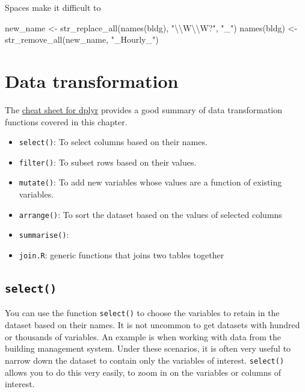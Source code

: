\documentclass[
]{book}
\newenvironment{Shaded}{\begin{snugshade}}{\end{snugshade}}
\newcommand{\FunctionTok}[1]{\textcolor[rgb]{0.00,0.00,0.00}{#1}}
\newcommand{\NormalTok}[1]{#1}
\newcommand{\OtherTok}[1]{\textcolor[rgb]{0.56,0.35,0.01}{#1}}
\newcommand{\SpecialCharTok}[1]{\textcolor[rgb]{0.00,0.00,0.00}{#1}}
\newcommand{\StringTok}[1]{\textcolor[rgb]{0.31,0.60,0.02}{#1}}
\providecommand{\tightlist}{%
  \setlength{\itemsep}{0pt}\setlength{\parskip}{0pt}}
\begin{document}
Spaces make it difficult to

\begin{Shaded}
\begin{Highlighting}[]
\NormalTok{new\_name }\OtherTok{\textless{}{-}} \FunctionTok{str\_replace\_all}\NormalTok{(}\FunctionTok{names}\NormalTok{(bldg), }\StringTok{"}\SpecialCharTok{\textbackslash{}\textbackslash{}}\StringTok{W}\SpecialCharTok{\textbackslash{}\textbackslash{}}\StringTok{W?"}\NormalTok{, }\StringTok{"\_"}\NormalTok{)}
\FunctionTok{names}\NormalTok{(bldg) }\OtherTok{\textless{}{-}} \FunctionTok{str\_remove\_all}\NormalTok{(new\_name, }\StringTok{"\_Hourly\_"}\NormalTok{)}
\end{Highlighting}
\end{Shaded}

\hypertarget{data-transformation}{%
\section{Data transformation}\label{data-transformation}}

The \href{https://github.com/rstudio/cheatsheets/blob/master/data-transformation.pdf}{cheat sheet for dplyr} provides a good summary of data transformation functions covered in this chapter.

\begin{itemize}
\tightlist
\item
  \texttt{select()}: To select columns based on their names.
\item
  \texttt{filter()}: To subset rows based on their values.
\item
  \texttt{mutate()}: To add new variables whose values are a function of existing variables.
\item
  \texttt{arrange()}: To sort the dataset based on the values of selected columns
\item
  \texttt{summarise()}:
\item
  \texttt{join.R}: generic functions that joins two tables together
\end{itemize}

\hypertarget{select}{%
\subsection{\texorpdfstring{\texttt{select()}}{select()}}\label{select}}

You can use the function \texttt{select()} to choose the variables to retain in the dataset based on their names. It is not uncommon to get datasets with hundred or thousands of variables. An example is when working with data from the building management system. Under these scenarios, it is often very useful to narrow down the dataset to contain only the variables of interest. \texttt{select()} allows you to do this very easily, to zoom in on the variables or columns of interest.
\end{document}
